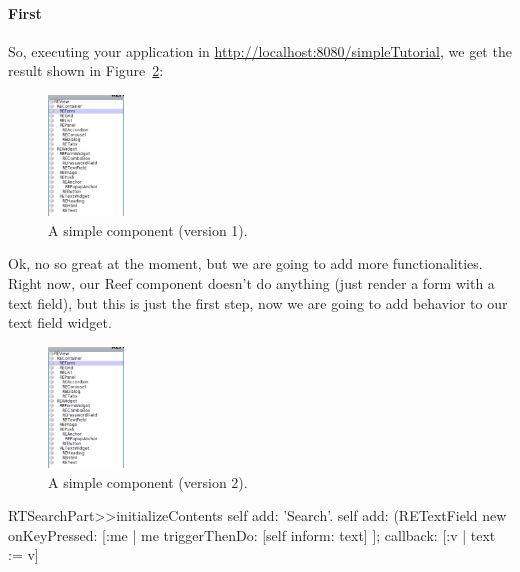 \documentclass[a4paper,10pt,twoside]{book}
\begin{document}
\paragraph{First }

So, executing your application in \url{http://localhost:8080/simpleTutorial}, we get the result shown in Figure~\ref{first}:

\begin{figure}[h]
\begin{center}
\includegraphics[width=2cm]{REViewHierarchy}
\caption{A simple component (version 1).\label{first}}
\end{center}
\end{figure}

Ok, no so great at the moment, but we are going to add more functionalities.
Right now, our Reef component doesn't do anything (just render a form with a text field), but this is 
just the first step, now we are going to add behavior to our text field widget.


\begin{figure}[h]
\begin{center}
\includegraphics[width=2cm]{REViewHierarchy}
\caption{A simple component (version 2).\label{first}}
\end{center}
\end{figure}

\begin{code}{}
RTSearchPart>>initializeContents
	self add: 'Search'.
	self add: (RETextField new
		onKeyPressed: [:me | me triggerThenDo: [self inform: text] ];
		callback: [:v | text := v]
\end{code}
\end{document}

